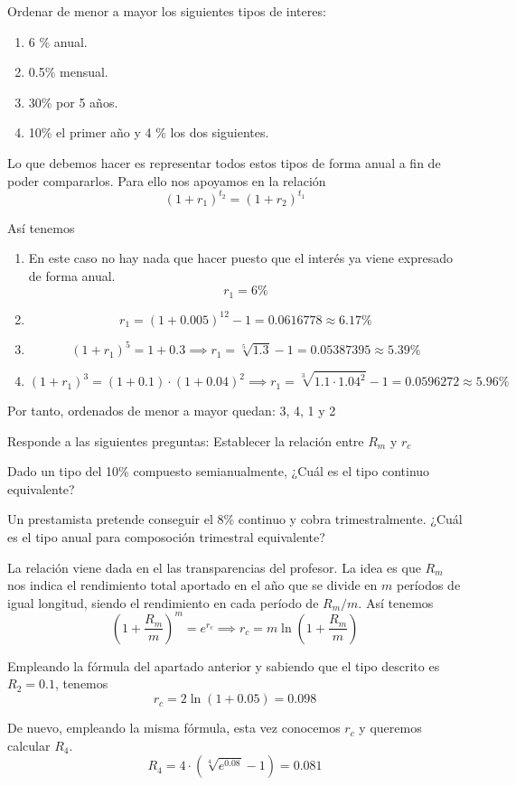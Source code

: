 \begin{problem}[3]
Ordenar de menor a mayor los siguientes tipos de interes:
\begin{enumerate}
\item 6 \% anual.
\item 0.5\% mensual.
\item 30\% por 5 años.
\item 10\% el primer año y 4 \% los dos siguientes.
\end{enumerate}
\solution

Lo que debemos hacer es representar todos estos tipos de forma anual a fin de poder compararlos. Para ello nos apoyamos en la relación
\[(1+r_1)^{t_2} = (1+r_2)^{t_1}\]

Así tenemos

\begin{enumerate}
\item En este caso no hay nada que hacer puesto que el interés ya viene expresado de forma anual.
\[r_1 = 6\% \]
\item
\[r_1 = (1+0.005)^{12} - 1 = 0.0616778 \approx 6.17\%\]
\item
\[(1+r_1)^5 = 1+0.3 \implies r_1 = \sqrt[5]{1.3}-1 = 0.05387395 \approx 5.39\%\]
\item
\[(1+r_1)^3 = (1+0.1)\cdot (1+0.04)^2 \implies r_1 = \sqrt[3]{1.1 \cdot 1.04^2}-1 = 0.0596272 \approx 5.96\%\]
\end{enumerate}

Por tanto, ordenados de menor a mayor quedan: 3, 4, 1 y 2
\end{problem}

\begin{problem}[4]
Responde a las siguientes preguntas:
\ppart Establecer la relación entre $R_m$ y $r_c$

\ppart Dado un tipo del 10\% compuesto semianualmente, ¿Cuál es el tipo continuo equivalente?

\ppart Un prestamista pretende conseguir el 8\% continuo y cobra trimestralmente. ¿Cuál es el tipo anual para composoción trimestral equivalente?

\solution

\spart

La relación viene dada en el las transparencias del profesor. La idea es que $R_m$ nos indica el rendimiento total aportado en el año que se divide en $m$ períodos de igual longitud, siendo el rendimiento en cada período de $R_m/m$. Así tenemos
\[\left(1+\frac{R_m}{m}\right)^{m}=e^{r_c} \implies r_c = m \ln\left( 1+\frac{R_m}{m}\right)\]

\spart Empleando la fórmula del apartado anterior y sabiendo que el tipo descrito es $R_2=0.1$, tenemos
\[r_c = 2 \ln\left( 1+0.05\right) = 0.098\]

\spart De nuevo, empleando la misma fórmula, esta vez conocemos $r_c$ y queremos calcular $R_4$.
\[R_4 = 4\cdot \left(\sqrt[4]{e^{0.08}}-1\right) = 0.081\]

\end{problem}

